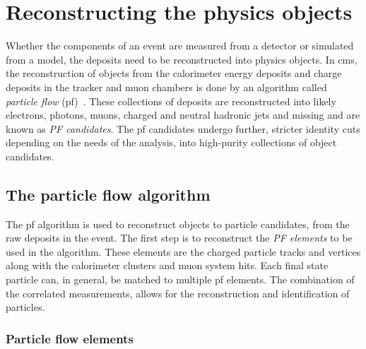 \chapter{Reconstructing the physics objects}
\label{ch:ObjectReconstruction}

Whether the components of an event are measured from a detector or simulated from a model, the deposits need to be reconstructed into physics objects. 
In \acrshort{cms}, the reconstruction of objects from the calorimeter energy deposits and charge deposits in the tracker and muon chambers is done by an algorithm called \textit{particle flow} (\acrshort{pf})~\cite{Event:PFlow}.
These collections of deposits are reconstructed into likely electrons, photons, muons, charged and neutral hadronic jets and missing \pt{} and are known as \textit{PF candidates}.
The \acrshort{pf} candidates undergo further, stricter identity cuts depending on the needs of the analysis, into high-purity collections of object candidates.


\section{The particle flow algorithm}
\label{sec:PFlow}

The \acrshort{pf} algorithm is used to reconstruct objects to particle candidates, from the raw deposits in the event. 
The first step is to reconstruct the \textit{PF elements} to be used in the algorithm.
These elements are the charged particle tracks and vertices along with the calorimeter clusters and muon system hits.
Each final state particle can, in general, be matched to multiple \acrshort{pf} elements.
The combination of the correlated measurements, allows for the reconstruction and identification of particles.

\subsection{Particle flow elements} %
\label{sub:Particle_flow_elements}

